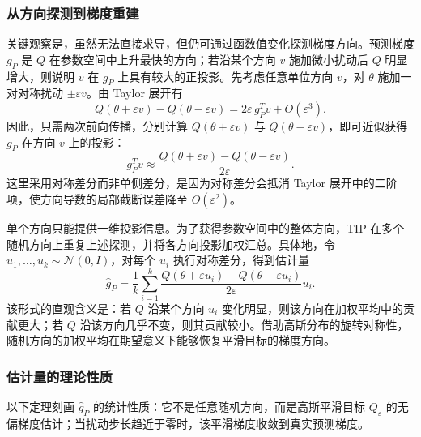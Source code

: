\documentclass{article}
\begin{document}
\subsubsection{从方向探测到梯度重建}

关键观察是，虽然无法直接求导，但仍可通过函数值变化探测梯度方向。预测梯度 $g_P$ 是 $Q$ 在参数空间中上升最快的方向；若沿某个方向 $v$ 施加微小扰动后 $Q$ 明显增大，则说明 $v$ 在 $g_P$ 上具有较大的正投影。先考虑任意单位方向 $v$，对 $\theta$ 施加一对对称扰动 $\pm\varepsilon v$。由 Taylor 展开有
\begin{equation}
	Q(\theta + \varepsilon v) - Q(\theta - \varepsilon v) = 2\varepsilon \, g_P^T v + O(\varepsilon^3).
\end{equation}
因此，只需两次前向传播，分别计算 $Q(\theta+\varepsilon v)$ 与 $Q(\theta-\varepsilon v)$，即可近似获得 $g_P$ 在方向 $v$ 上的投影：
\[
	g_P^T v \approx \frac{Q(\theta+\varepsilon v)-Q(\theta-\varepsilon v)}{2\varepsilon}.
\]
这里采用对称差分而非单侧差分，是因为对称差分会抵消 Taylor 展开中的二阶项，使方向导数的局部截断误差降至 $O(\varepsilon^2)$。

单个方向只能提供一维投影信息。为了获得参数空间中的整体方向，TIP 在多个随机方向上重复上述探测，并将各方向投影加权汇总。具体地，令 $u_1,\dots,u_k\sim\mathcal{N}(0,I)$，对每个 $u_i$ 执行对称差分，得到估计量
\begin{equation}\label{eq:gp_estimator}
	\hat{g}_P = \frac{1}{k} \sum_{i=1}^k \frac{Q(\theta + \varepsilon u_i) - Q(\theta - \varepsilon u_i)}{2\varepsilon} u_i.
\end{equation}
该形式的直观含义是：若 $Q$ 沿某个方向 $u_i$ 变化明显，则该方向在加权平均中的贡献更大；若 $Q$ 沿该方向几乎不变，则其贡献较小。借助高斯分布的旋转对称性，随机方向的加权平均在期望意义下能够恢复平滑目标的梯度方向。

\subsubsection{估计量的理论性质}

以下定理刻画 $\hat{g}_P$ 的统计性质：它不是任意随机方向，而是高斯平滑目标 $Q_\varepsilon$ 的无偏梯度估计；当扰动步长趋近于零时，该平滑梯度收敛到真实预测梯度。
\end{document}
